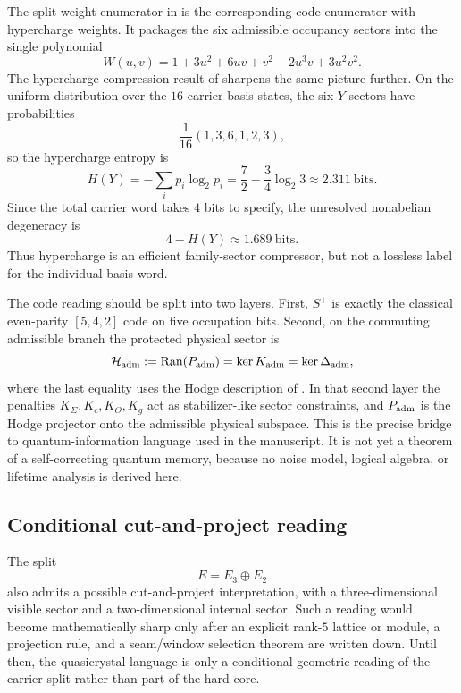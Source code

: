 The split weight enumerator in  is the corresponding code enumerator with hypercharge weights. It packages the six admissible occupancy sectors into the single polynomial
\[
W(u,v)
=
1+3u^2+6uv+v^2+2u^3v+3u^2v^2.
\]
The hypercharge-compression result of  sharpens the same picture further. On the uniform distribution over the $16$ carrier basis states, the six $Y$-sectors have probabilities
\[
\frac1{16}(1,3,6,1,2,3),
\]
so the hypercharge entropy is
\[
H(Y)
=
-\sum_i p_i\log_2 p_i
=
\frac72-\frac34\log_2 3
\approx
\num{2.311}\ \text{bits}.
\]
Since the total carrier word takes $4$ bits to specify, the unresolved nonabelian degeneracy is
\[
4-H(Y)\approx \num{1.689}\ \text{bits}.
\]
Thus hypercharge is an efficient family-sector compressor, but not a lossless label for the individual basis word.

\begin{remark}
The code reading should be split into two layers. First, $S^+$ is exactly the classical even-parity $[5,4,2]$ code on five occupation bits. Second, on the commuting admissible branch the protected physical sector is
\[
\mathcal H_{\mathrm{adm}}
:=
\operatorname{Ran}(P_{\mathrm{adm}})
=
\ker K_{\mathrm{adm}}
=
\ker \Delta_{\mathrm{adm}},
\]
where the last equality uses the Hodge description of . In that second layer the penalties $K_\Sigma,K_c,K_\Theta,K_g$ act as stabilizer-like sector constraints, and $P_{\mathrm{adm}}$ is the Hodge projector onto the admissible physical subspace. This is the precise bridge to quantum-information language used in the manuscript. It is not yet a theorem of a self-correcting quantum memory, because no noise model, logical algebra, or lifetime analysis is derived here.
\end{remark}

\subsection{Conditional cut-and-project reading}

The split
\[
E=E_3\oplus E_2
\]
also admits a possible cut-and-project interpretation, with a three-dimensional visible sector and a two-dimensional internal sector. Such a reading would become mathematically sharp only after an explicit rank-$5$ lattice or module, a projection rule, and a seam/window selection theorem are written down. Until then, the quasicrystal language is only a conditional geometric reading of the carrier split rather than part of the hard core.

